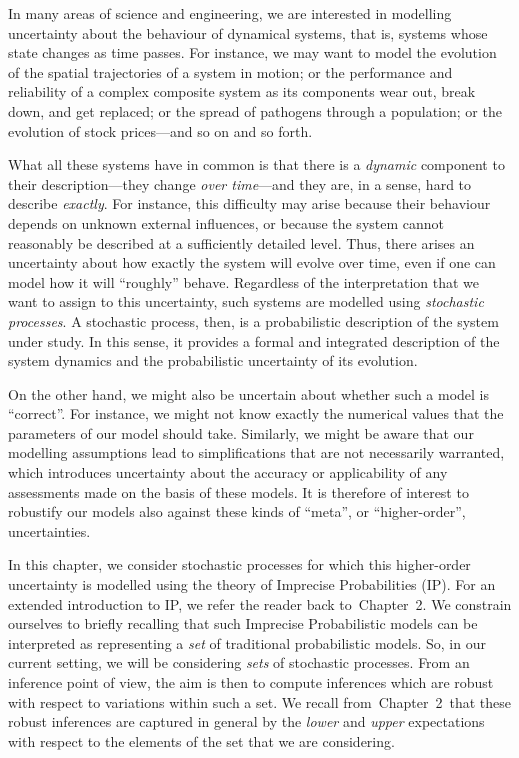 \documentclass[graybox]{svmult}
\def\refIPChapter{Chapter~2}
\begin{document}
In many areas of science and engineering, we are interested in modelling uncertainty about the behaviour of dynamical systems, that is, systems whose state changes as time passes. For instance, we may want to model the evolution of the spatial trajectories of a system in motion; or the performance and reliability of a complex composite system as its components wear out, break down, and get replaced; or the spread of pathogens through a population; or the evolution of stock prices---and so on and so forth. 

What all these systems have in common is that there is a \emph{dynamic} component to their description---they change \emph{over time}---and they are, in a sense, hard to describe \emph{exactly}. For instance, this difficulty may arise because their behaviour depends on unknown external influences, or because the system cannot reasonably be described at a sufficiently detailed level. Thus, there arises an uncertainty about how exactly the system will evolve over time, even if one can model how it will ``roughly'' behave.
Regardless of the interpretation that we want to assign to this uncertainty, such systems are modelled using \emph{stochastic processes}. A stochastic process, then, is a probabilistic description of the system under study. In this sense, it provides a formal and integrated description of the system dynamics and the probabilistic uncertainty of its evolution.

On the other hand, we might also be uncertain about whether such a model is ``correct''. For instance, we might not know exactly the numerical values that the parameters of our model should take. Similarly, we might be aware that our modelling assumptions lead to simplifications that are not necessarily warranted, which introduces uncertainty about the accuracy or applicability of any assessments made on the basis of these models. It is therefore of interest to robustify our models also against these kinds of ``meta'', or ``higher-order'', uncertainties.

In this chapter, we consider stochastic processes for which this higher-order uncertainty is modelled using the theory of Imprecise Probabilities (IP). For an extended introduction to IP, we refer the reader back to~\refIPChapter. We constrain ourselves to briefly recalling that such Imprecise Probabilistic models can be interpreted as representing a \emph{set} of traditional probabilistic models. So, in our current setting, we will be considering \emph{sets} of stochastic processes. From an inference point of view, the aim is then to compute inferences which are robust with respect to variations within such a set. We recall from~\refIPChapter~that these robust inferences are captured in general by the \emph{lower} and \emph{upper} expectations with respect to the elements of the set that we are considering.
\end{document}
